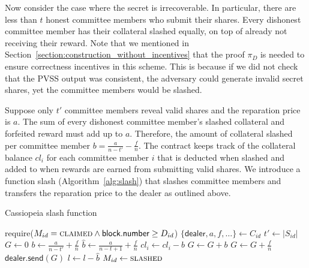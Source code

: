 Now consider the case where the secret is irrecoverable.
In particular, there are less than $t$ honest committee members who submit their shares.
Every dishonest committee member has their collateral slashed equally, on top of already not receiving their reward.
Note that we mentioned in Section~\ref{section:construction_without_incentives} that the proof $\pi_D$ is needed to ensure correctness incentives in this scheme.
This is because if we did not check that the PVSS output was consistent, the adversary could generate invalid secret shares, yet the committee members would be slashed.

Suppose only $t'$ committee members reveal valid shares and the reparation price is $a$.
The sum of every dishonest committee member's slashed collateral and forfeited reward must add up to $a$.
Therefore, the amount of collateral slashed per committee member $b = \frac{a}{n - t'} - \frac{f}{n}$.
The contract keeps track of the collateral balance $cl_i$ for each committee member $i$ that is deducted when slashed and added to when rewards are earned from submitting valid shares.
We introduce a function \textsf{slash} (Algorithm~\ref{alg:slash}) that slashes committee members and transfers the reparation price to the dealer as outlined above.

\begin{algorithm}[h]
\caption{Cassiopeia \textsf{slash} function}
\label{alg:slash}
    \begin{algorithmic}[1]
                \State require($M_{id} = \textsc{claimed} \land \textsf{block.number} \geq D_{id}$)
                \State $\{\textsf{dealer}, a, f, \dots\} \gets C_{id}$
                \State $t' \gets |S_{id}|$
                \State $G \gets 0$
                \State $b \gets \frac{a}{n - t'} + \frac{f}{n}$
                \State $\hat{b} \gets \frac{a}{n - t + 1} + \frac{f}{n}$ 
                            \State $cl_i \gets cl_i - b$
                            \State $G \gets G + b$
                        \EndIf
                        \State $G \gets G + \frac{f}{n}$
                    \EndIf
                \EndFor
                \State $\textsf{dealer.send}(G)$
                \State $l \gets l - \hat{b}$ 
                \State $M_{id} \gets \textsc{slashed}$
            \EndFunction
    \end{algorithmic}
\end{algorithm}


